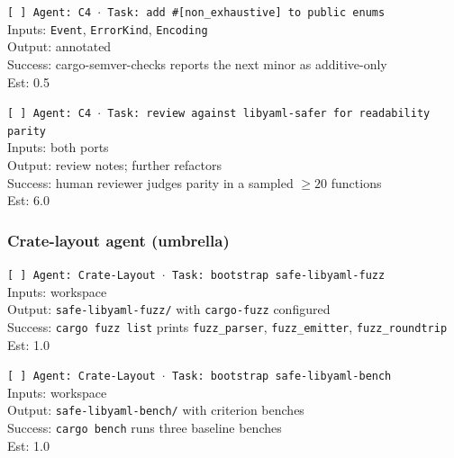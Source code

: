\documentclass[12pt]{article}
\theoremstyle{definition}
\theoremstyle{remark}
\begin{document}
\begin{small}
\noindent\texttt{[ ] Agent: C4 $\cdot$ Task: add \#[non\_exhaustive] to public enums}\\
\hspace*{2em}Inputs: \texttt{Event}, \texttt{ErrorKind}, \texttt{Encoding}\\
\hspace*{2em}Output: annotated\\
\hspace*{2em}Success: cargo-semver-checks reports the next minor as additive-only\\
\hspace*{2em}Est: 0.5

\noindent\texttt{[ ] Agent: C4 $\cdot$ Task: review against libyaml-safer for readability parity}\\
\hspace*{2em}Inputs: both ports\\
\hspace*{2em}Output: review notes; further refactors\\
\hspace*{2em}Success: human reviewer judges parity in a sampled $\geq 20$ functions\\
\hspace*{2em}Est: 6.0
\end{small}

\subsubsection{Crate-layout agent (umbrella)}

\begin{small}
\noindent\texttt{[ ] Agent: Crate-Layout $\cdot$ Task: bootstrap safe-libyaml-fuzz}\\
\hspace*{2em}Inputs: workspace\\
\hspace*{2em}Output: \texttt{safe-libyaml-fuzz/} with \texttt{cargo-fuzz} configured\\
\hspace*{2em}Success: \texttt{cargo fuzz list} prints \texttt{fuzz\_parser}, \texttt{fuzz\_emitter}, \texttt{fuzz\_roundtrip}\\
\hspace*{2em}Est: 1.0

\noindent\texttt{[ ] Agent: Crate-Layout $\cdot$ Task: bootstrap safe-libyaml-bench}\\
\hspace*{2em}Inputs: workspace\\
\hspace*{2em}Output: \texttt{safe-libyaml-bench/} with criterion benches\\
\hspace*{2em}Success: \texttt{cargo bench} runs three baseline benches\\
\hspace*{2em}Est: 1.0
\end{small}
\end{document}

